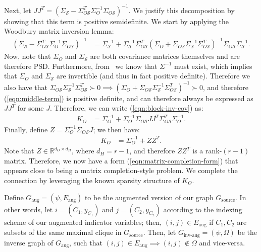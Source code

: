 \documentclass[letterpaper]{article}
\begin{document}
\begin{appendix}
Next, let $JJ^T = \left( \Sigma_\mathcal{S} - \Sigma_{O\mathcal{S}}^T\Sigma_O^{-1}\Sigma_{O\mathcal{S}} \right)^{-1}$.
We justify this decomposition by showing that this term is positive semidefinite.
We start by applying the Woodbury matrix inversion lemma:
\begin{align}
	\label{eqn:middle-term}
	\left( \Sigma_\mathcal{S} - \Sigma_{O\mathcal{S}}^T\Sigma_O^{-1}\Sigma_{O\mathcal{S}} \right)^{-1}
	&=
	\Sigma_\mathcal{S}^{-1}
	+ \Sigma_\mathcal{S}^{-1}\Sigma_{O\mathcal{S}}^T \left( \Sigma_O + \Sigma_{O\mathcal{S}}\Sigma_\mathcal{S}^{-1}\Sigma_{O\mathcal{S}}^T \right)^{-1} \Sigma_{O\mathcal{S}}\Sigma_\mathcal{S}^{-1}.
\end{align}
Now, note that $\Sigma_O$ and $\Sigma_\mathcal{S}$ are both covariance matrices themselves and are therefore PSD.
Furthermore, from~\cite{loh2012structure} we know that $\Sigma^{-1}$ must exist, which implies that $\Sigma_O$ and $\Sigma_\mathcal{S}$ are invertible (and thus in fact positive definite).
Therefore we also have that $\Sigma_{O\mathcal{S}}\Sigma_\mathcal{S}^{-1}\Sigma_{O\mathcal{S}}^T \succ 0 \implies \left( \Sigma_O + \Sigma_{O\mathcal{S}}\Sigma_\mathcal{S}^{-1}\Sigma_{O\mathcal{S}}^T \right)^{-1} \succ 0$, and therefore (\ref{eqn:middle-term}) is positive definite, and can therefore always be expressed as $JJ^T$ for some $J$.
Therefore, we can write (\ref{eqn:block-inv-cov}) as:
\begin{align*}
	K_O
	&=
	\Sigma_O^{-1}
	+ \Sigma_O^{-1}\Sigma_{O\mathcal{S}} JJ^T \Sigma_{O\mathcal{S}}^T\Sigma_O^{-1}.
\end{align*}
Finally, define $Z = \Sigma_O^{-1}\Sigma_{O\mathcal{S}} J$; we then have:
\begin{align}
	\label{eqn:matrix-completion-form}
	K_O
	&=
	\Sigma_O^{-1} + ZZ^T.
\end{align}
Note that $Z \in \mathbb{R}^{d_O \times d_H}$, where $d_H = r-1$, and therefore $ZZ^T$ is a rank-$(r-1)$ matrix.
Therefore, we now have a form (\ref{eqn:matrix-completion-form}) that appears close to being a matrix completion-style problem.
We complete the connection by leveraging the known sparsity structure of $K_O$.

Define $G_{\text{aug}} = (\psi, E_{\text{aug}})$ to be the augmented version of our graph $G_{\text{source}}$.
In other words, let $i = (C_1, y_{C_1})$ and $j = (C_2, y_{C_2})$ according to the indexing scheme of our augmented indicator variables; then, $(i,j) \in E_{\text{aug}}$ if $C_1, C_2$ are subsets of the same maximal clique in $G_{\text{source}}$.
Then, let $G_{\text{inv-aug}} = (\psi, \Omega)$ be the inverse graph of $G_{\text{aug}}$, such that $(i,j) \in  E_{\text{aug}} \implies (i,j) \notin \Omega$ and vice-versa.


\end{appendix}
\end{document}
